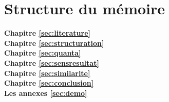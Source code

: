 \section{Structure du mémoire}
\label{sec:intro:organisation}

\textbf{Chapitre \ref{sec:literature}} \\[0.2em]

\textbf{Chapitre \ref{sec:structuration}} \\[0.2em]

\textbf{Chapitre \ref{sec:quanta}} \\[0.2em]

\textbf{Chapitre \ref{sec:sensresultat}} \\[0.2em]

\textbf{Chapitre \ref{sec:similarite}} \\[0.2em]

\textbf{Chapitre \ref{sec:conclusion}} \\[0.2em]

\textbf{Les annexes \ref{sec:demo}} \\[0.2em]
